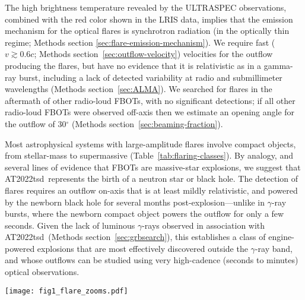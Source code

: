 \documentclass{nature_plusfigure}
\newcommand{\at}{AT2022tsd}
\begin{document}
The high brightness temperature revealed by the ULTRASPEC observations, combined with the red color shown in the LRIS data, implies that the emission mechanism for the optical flares is synchrotron radiation (in the optically thin regime; Methods section \ref{sec:flare-emission-mechanism}). 
We require fast ($v\gtrsim0.6c$; Methods section~\ref{sec:outflow-velocity}) velocities for the outflow producing the flares, but have no evidence that it is relativistic as in a gamma-ray burst, including a lack of detected variability at radio and submillimeter wavelengths (Methods section~\ref{sec:ALMA}).
We searched for flares in the aftermath of other radio-loud FBOTs, with no significant detections; if all other radio-loud FBOTs were observed off-axis then we estimate an opening angle for the outflow of 30$^{\circ}$ (Methods section~\ref{sec:beaming-fraction}).

Most astrophysical systems with large-amplitude flares involve compact objects, from stellar-mass to supermassive (Table~\ref{tab:flaring-classes}). By analogy, and several lines of evidence that FBOTs are massive-star explosions, we suggest that \at\ represents the birth of a neutron star or black hole.
The detection of flares requires an outflow on-axis that is at least mildly relativistic, and powered by the newborn black hole for several months post-explosion---unlike in $\gamma$-ray bursts, where the newborn compact object powers the outflow for only a few seconds. Given the lack of luminous $\gamma$-rays observed in association with \at\ (Methods section~\ref{sec:grbsearch}), this establishes a class of engine-powered explosions that are most effectively discovered outside the $\gamma$-ray band, and whose outflows can be studied using very high-cadence (seconds to minutes) optical observations.

\newpage

\begin{figure*}
\centering
    \texttt{[image: fig1\_flare\_zooms.pdf]}
\caption{\textbf{\at\ optical light curve.}
  The original transient event (top panel, $\Delta t_\mathrm{obs}<28\,$d) was followed by prominent short-duration (minutes to hours) flares with amplitudes of a few to $100\times$. Measurements have been corrected for Milky Way extinction, and error bars are 1-$\sigma$. Upper limits (3-$\sigma$) are shown as open triangles. Epochs of follow-up observations (optical spectroscopy, X-ray, and radio) are marked in the top panel. Absolute magnitude is AB magnitudes of the rest-frame filterband blueshifted by $(1+z)$. For ULTRASPEC observations, points with S/N$>5$ are filled in, and the $g$-band inset shows the light curve smoothed using a 3-minute running average.}
 \label{fig:optical-lc}
\end{figure*}
\end{document}
